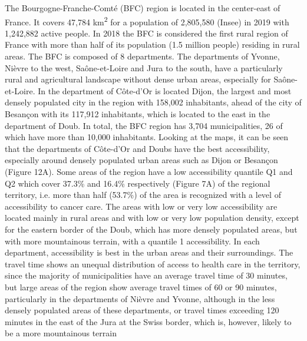 The Bourgogne-Franche-Comté (BFC) region is located in the center-east of France. It covers 47,784 km\textsuperscript{2} for a population of 2,805,580 (Insee) in 2019 with 1,242,882 active people. In 2018 the BFC is considered the first rural region of France with more than half of its population (1.5 million people) residing in rural areas. The BFC is composed of 8 departments. The departments of Yvonne, Nièvre to the west, Saône-et-Loire and Jura to the south, have a particularly rural and agricultural landscape without dense urban areas, especially for Saône-et-Loire.  In the department of Côte-d'Or is located Dijon, the largest and most densely populated city in the region with 158,002 inhabitants, ahead of the city of Besançon with its 117,912 inhabitants, which is located to the east in the department of Doub. In total, the BFC region has 3,704 municipalities, 26 of which have more than 10,000 inhabitants. Looking at the maps, it can be seen that the departments of Côte-d'Or and Doubs have the best accessibility, especially around densely populated urban areas such as Dijon or Besançon (Figure 12A). Some areas of the region have a low accessibility quantile Q1 and Q2 which cover 37.3\% and 16.4\% respectively (Figure 7A) of the regional territory, i.e. more than half (53.7\%) of the area is recognized with a level of accessibility to cancer care. The areas with low or very low accessibility are located mainly in rural areas and with low or very low population density, except for the eastern border of the Doub, which has more densely populated areas, but with more mountainous terrain, with a quantile 1 accessibility. In each department, accessibility is best in the urban areas and their surroundings.
The travel time shows an unequal distribution of access to health care in the territory, since the majority of municipalities have an average travel time of 30 minutes, but large areas of the region show average travel times of 60 or 90 minutes, particularly in the departments of Nièvre and Yvonne, although in the less densely populated areas of these departments, or travel times exceeding 120 minutes in the east of the Jura at the Swiss border, which is, however, likely to be a more mountainous terrain

